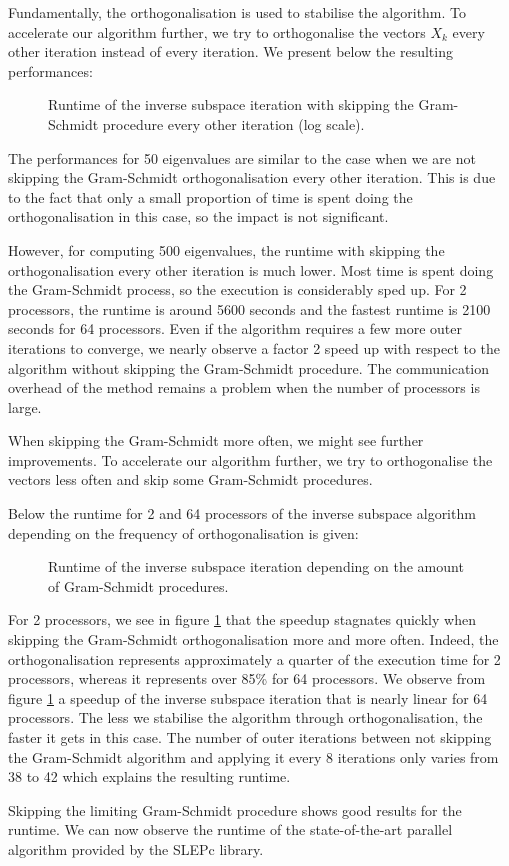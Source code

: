 Fundamentally, the orthogonalisation is used to stabilise the algorithm.
\ifthesis
 To accelerate our algorithm further, we try to orthogonalise the vectors \(X_k\) every other iteration instead of every iteration.
 We present below the resulting performances:

 \begin{figure}[H]
  \centering
  
  \caption{Runtime of the inverse subspace iteration with skipping the Gram-Schmidt procedure every other iteration (log scale).}
 \end{figure}

 The performances for 50 eigenvalues are similar to the case when we are not skipping the Gram-Schmidt orthogonalisation every other iteration.
 This is due to the fact that only a small proportion of time is spent doing the orthogonalisation in this case, so the impact is not significant.

 However, for computing 500 eigenvalues, the runtime with skipping the orthogonalisation every other iteration is much lower.
 Most time is spent doing the Gram-Schmidt process, so the execution is considerably sped up.
 For 2 processors, the runtime is around 5600 seconds and the fastest runtime is 2100 seconds for 64 processors.
 Even if the algorithm requires a few more outer iterations to converge, we nearly observe a factor 2 speed up with respect to the algorithm without skipping the Gram-Schmidt procedure.
 The communication overhead of the method remains a problem when the number of processors is large.

 When skipping the Gram-Schmidt more often, we might see further improvements.
\else
 To accelerate our algorithm further, we try to orthogonalise the vectors less often and skip some Gram-Schmidt procedures.
\fi

Below the runtime for 2 and 64 processors of the inverse subspace algorithm depending on the frequency of orthogonalisation is given:

\begin{figure}[H]
 \centering
 
 \caption{Runtime of the inverse subspace iteration depending on the amount of Gram-Schmidt procedures.}
 \label{fig:skip_gs}
\end{figure}

For 2 processors, we see in figure \ref{fig:skip_gs} that the speedup stagnates quickly when skipping the Gram-Schmidt orthogonalisation more and more often.
Indeed, the orthogonalisation represents approximately a quarter of the execution time for 2 processors, whereas it represents over 85\% for 64 processors.
We observe from figure \ref{fig:skip_gs} a speedup of the inverse subspace iteration that is nearly linear for 64 processors.
The less we stabilise the algorithm through orthogonalisation, the faster it gets in this case. 
The number of outer iterations between not skipping the Gram-Schmidt algorithm and applying it every 8 iterations only varies from 38 to 42 which explains the resulting runtime.

\ifthesis
 Skipping the limiting Gram-Schmidt procedure shows good results for the runtime.
 We can now observe the runtime of the state-of-the-art parallel algorithm provided by the SLEPc library.
\fi
